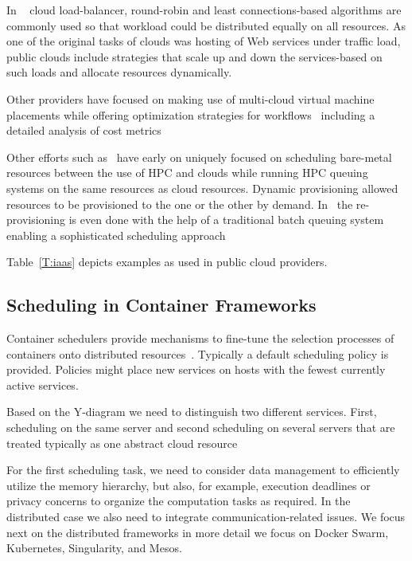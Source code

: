 \documentclass[final,5p,times,twocolumn]{elsarticle}
\begin{document}
In ~\cite{Rackspace2016} cloud load-balancer, round-robin and least connections-based algorithms are commonly used so that workload could be distributed equally on all resources. As one of the original tasks of clouds was hosting of Web services under traffic load, public clouds include strategies that scale up and down the services-based on such loads and allocate resources dynamically.

Other providers have focused on making use of multi-cloud virtual machine placements while offering optimization strategies for workflows~\cite{CloudSigma2016} including a detailed analysis of cost metrics~\cite{Cloudmetrics2019}

Other efforts such as~\cite{las12fg-bookchapter,fox2013futuregrid} have early on uniquely focused on scheduling bare-metal resources between the use of HPC and clouds while running HPC queuing systems on the same resources as cloud resources. Dynamic provisioning allowed resources to be provisioned to the one or the other by demand. In~\cite{las-comet} the re-provisioning is even done with the help of a traditional batch queuing system enabling a sophisticated scheduling approach

Table~\ref{T:iaas} depicts examples as used in public cloud providers.



%


\subsection{Scheduling in Container Frameworks}
\label{sec:container}


Container schedulers provide mechanisms to fine-tune the selection processes of containers onto distributed resources~\cite{Containers2018,de2018distributed}. Typically a default scheduling policy is provided. Policies might place new services on hosts with the fewest currently active services.

Based on the Y-diagram we need to distinguish two different services. First, scheduling on the same server and second scheduling on several servers that are treated typically as one abstract cloud resource

For the first scheduling task, we need to consider data management to efficiently utilize the memory hierarchy, but also, for example, execution deadlines or privacy concerns to organize the computation tasks as required. In the distributed case we also need to integrate communication-related issues. We focus next on the distributed frameworks in more detail we focus on Docker Swarm, Kubernetes, Singularity, and Mesos.
\end{document}
